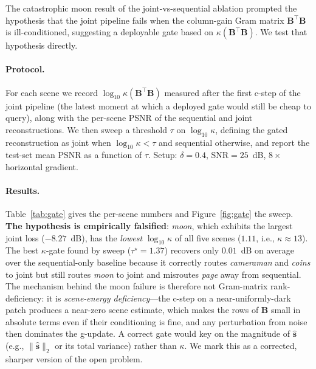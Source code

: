 \documentclass{article}
\begin{document}
The catastrophic moon result of the joint-vs-sequential ablation prompted the hypothesis that the joint pipeline fails when the column-gain Gram matrix $\boldsymbol{B}^\top\boldsymbol{B}$ is ill-conditioned, suggesting a deployable gate based on $\kappa(\boldsymbol{B}^\top\boldsymbol{B})$. We test that hypothesis directly.

\paragraph{Protocol.} For each scene we record $\log_{10}\kappa(\boldsymbol{B}^\top\boldsymbol{B})$ measured after the first c-step of the joint pipeline (the latest moment at which a deployed gate would still be cheap to query), along with the per-scene PSNR of the sequential and joint reconstructions. We then sweep a threshold $\tau$ on $\log_{10}\kappa$, defining the gated reconstruction as joint when $\log_{10}\kappa < \tau$ and sequential otherwise, and report the test-set mean PSNR as a function of $\tau$. Setup: $\delta{=}0.4$, SNR${=}25$~dB, $8\times$ horizontal gradient.

\paragraph{Results.} Table~\ref{tab:gate} gives the per-scene numbers and Figure~\ref{fig:gate} the sweep. \textbf{The hypothesis is empirically falsified}: \emph{moon}, which exhibits the largest joint loss ($-8.27$~dB), has the \emph{lowest} $\log_{10}\kappa$ of all five scenes ($1.11$, i.e., $\kappa \approx 13$). The best $\kappa$-gate found by sweep ($\tau^\star{=}1.37$) recovers only $0.01$~dB on average over the sequential-only baseline because it correctly routes \emph{cameraman} and \emph{coins} to joint but still routes \emph{moon} to joint and misroutes \emph{page} away from sequential. The mechanism behind the moon failure is therefore not Gram-matrix rank-deficiency: it is \emph{scene-energy deficiency}---the c-step on a near-uniformly-dark patch produces a near-zero scene estimate, which makes the rows of $\boldsymbol{B}$ small in absolute terms even if their conditioning is fine, and any perturbation from noise then dominates the g-update. A correct gate would key on the magnitude of $\hat{\boldsymbol{s}}$ (e.g., $\|\hat{\boldsymbol{s}}\|_2$ or its total variance) rather than $\kappa$. We mark this as a corrected, sharper version of the open problem.
\end{document}
